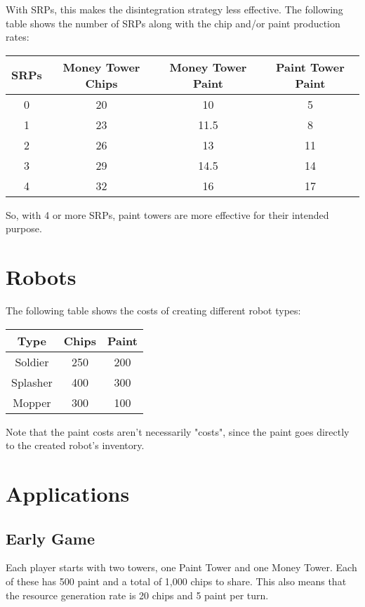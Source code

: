 \documentclass{article}
\begin{document}
  With SRPs, this makes the disintegration strategy less effective. The following table shows the number of SRPs along with the chip and/or paint production rates:
  \begin{center}
    \begin{tabular}{c | c | c | c}
      SRPs & Money Tower Chips & Money Tower Paint & Paint Tower Paint \\
      \hline
      0 & 20 & 10 & 5 \\
      1 & 23 & 11.5 & 8 \\
      2 & 26 & 13 & 11 \\
      3 & 29 & 14.5 & 14 \\
      4 & 32 & 16 & 17
    \end{tabular}
  \end{center}
  So, with 4 or more SRPs, paint towers are more effective for their intended purpose.
    
  \section*{Robots}

  The following table shows the costs of creating different robot types:

  \begin{center}
    \begin{tabular}{c | c | c}
      Type & Chips & Paint \\
      \hline
      Soldier & 250 & 200 \\
      Splasher & 400 & 300 \\
      Mopper & 300 & 100
    \end{tabular}
  \end{center}

  Note that the paint costs aren't necessarily "costs", since the paint goes directly to the created robot's inventory.

  \section*{Applications}

  \subsection*{Early Game}
  Each player starts with two towers, one Paint Tower and one Money Tower. Each of these has 500 paint and a total of 1,000 chips to share. This also means that the resource generation rate is 20 chips and 5 paint per turn.
\end{document}
